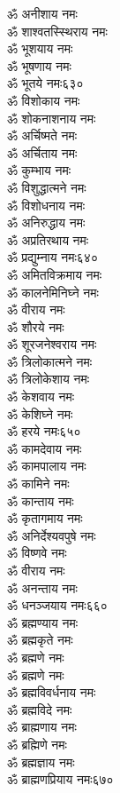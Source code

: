 \begin{multicols}{2}
\begin{flushleft}
ॐ अनीशाय नमः\\
ॐ शाश्वतस्स्थिराय नमः\\
ॐ भूशयाय नमः\\
ॐ भूषणाय नमः\\
ॐ भूतये नमः\hfill ६३०\\
ॐ विशोकाय नमः\\
ॐ शोकनाशनाय नमः\\
ॐ अर्चिष्मते नमः\\
ॐ अर्चिताय नमः\\
ॐ कुम्भाय नमः\\
ॐ विशुद्धात्मने नमः\\
ॐ विशोधनाय नमः\\
ॐ अनिरुद्धाय नमः\\
ॐ अप्रतिरथाय नमः\\
ॐ प्रद्युम्नाय नमः\hfill ६४०\\
ॐ अमितविक्रमाय नमः\\
ॐ कालनेमिनिघ्ने नमः\\
ॐ वीराय नमः\\
ॐ शौरये नमः\\
ॐ शूरजनेश्वराय नमः\\
ॐ त्रिलोकात्मने नमः\\
ॐ त्रिलोकेशाय नमः\\
ॐ केशवाय नमः\\
ॐ केशिघ्ने नमः\\
ॐ हरये नमः\hfill ६५०\\
ॐ कामदेवाय नमः\\
ॐ कामपालाय नमः\\
ॐ कामिने नमः\\
ॐ कान्ताय नमः\\
ॐ कृतागमाय नमः\\
ॐ अनिर्देश्यवपुषे नमः\\
ॐ विष्णवे नमः\\
ॐ वीराय नमः\\
ॐ अनन्ताय नमः\\
ॐ धनञ्जयाय नमः\hfill ६६०\\
ॐ ब्रह्मण्याय नमः\\
ॐ ब्रह्मकृते नमः\\
ॐ ब्रह्मणे नमः\\
ॐ ब्रह्मणे नमः\\
ॐ ब्रह्मविवर्धनाय नमः\\
ॐ ब्रह्मविदे नमः\\
ॐ ब्राह्मणाय नमः\\
ॐ ब्रह्मिणे नमः\\
ॐ ब्रह्मज्ञाय नमः\\
ॐ ब्राह्मणप्रियाय नमः\hfill ६७०\\

\end{flushleft}
\end{multicols}
